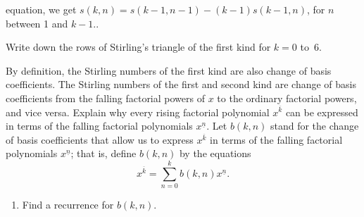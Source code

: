 {{equation, we get
$s(k,n) = s(k-1,n-1) -(k-1)s(k-1,n)$, for $n$ between 1 and $k-1$..}
\item Write down the  rows of Stirling's triangle of the first kind
 for $k=0$ to~6.
\ep

By definition, the Stirling numbers of the first kind are also change of
basis coefficients.
The Stirling numbers of the first and second kind are change of basis
coefficients from the falling factorial powers of $x$ to the ordinary
factorial powers, and vice versa. 
\bp 
\itemi Explain why every rising factorial polynomial $x^{\overline{k}}$
can be expressed in terms of the falling factorial polynomials
$x^{\underline{n}}$.  Let $b(k,n)$ stand for the change of basis
coefficients that allow us to express 
 $x^{\overline{k}}$  in terms of the falling factorial polynomials
$x^{\underline{n}}$; that is, define $b(k,n)$ by the equations
$$x^{\overline{k}}=\sum_{n=0}^k b(k,n) x^{\underline{n}}.$$ 
\begin{enumerate}
\item Find a recurrence
for $b(k,n)$. 
\end{enumerate}}
